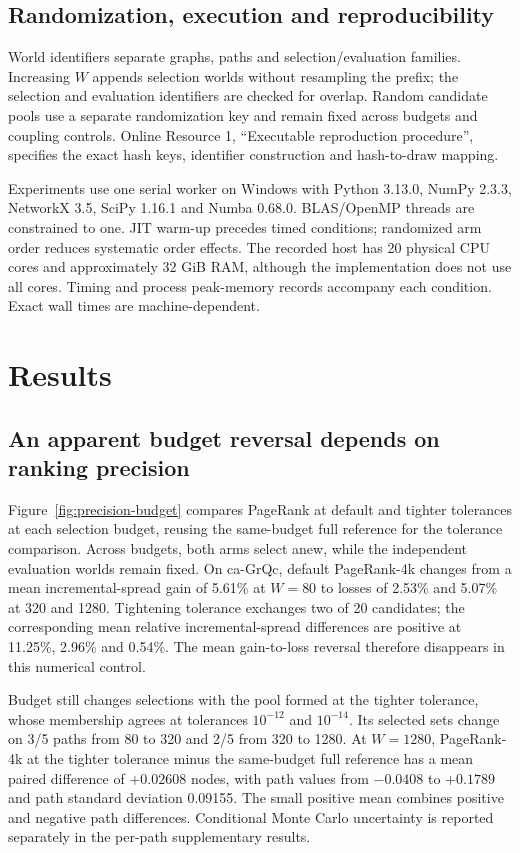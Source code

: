 \documentclass[smallextended]{svjour3}
\begin{document}
\subsection{Randomization, execution and reproducibility}
World identifiers separate graphs, paths and selection/evaluation families. Increasing $W$ appends selection worlds without resampling the prefix; the selection and evaluation identifiers are checked for overlap. Random candidate pools use a separate randomization key and remain fixed across budgets and coupling controls. Online Resource 1, ``Executable reproduction procedure'', specifies the exact hash keys, identifier construction and hash-to-draw mapping.

Experiments use one serial worker on Windows with Python 3.13.0, NumPy 2.3.3, NetworkX 3.5, SciPy 1.16.1 and Numba 0.68.0. BLAS/OpenMP threads are constrained to one. JIT warm-up precedes timed conditions; randomized arm order reduces systematic order effects. The recorded host has 20 physical CPU cores and approximately 32 GiB RAM, although the implementation does not use all cores. Timing and process peak-memory records accompany each condition. Exact wall times are machine-dependent.

\section{Results}
\subsection{An apparent budget reversal depends on ranking precision}
Figure~\ref{fig:precision-budget} compares PageRank at default and tighter tolerances at each selection budget, reusing the same-budget full reference for the tolerance comparison. Across budgets, both arms select anew, while the independent evaluation worlds remain fixed. On ca-GrQc, default PageRank-4k changes from a mean incremental-spread gain of 5.61\% at $W=80$ to losses of 2.53\% and 5.07\% at 320 and 1280. Tightening tolerance exchanges two of 20 candidates; the corresponding mean relative incremental-spread differences are positive at 11.25\%, 2.96\% and 0.54\%. The mean gain-to-loss reversal therefore disappears in this numerical control.

Budget still changes selections with the pool formed at the tighter tolerance, whose membership agrees at tolerances $10^{-12}$ and $10^{-14}$. Its selected sets change on 3/5 paths from 80 to 320 and 2/5 from 320 to 1280. At $W=1280$, PageRank-4k at the tighter tolerance minus the same-budget full reference has a mean paired difference of $+0.02608$ nodes, with path values from $-0.0408$ to $+0.1789$ and path standard deviation 0.09155. The small positive mean combines positive and negative path differences. Conditional Monte Carlo uncertainty is reported separately in the per-path supplementary results.
\end{document}
